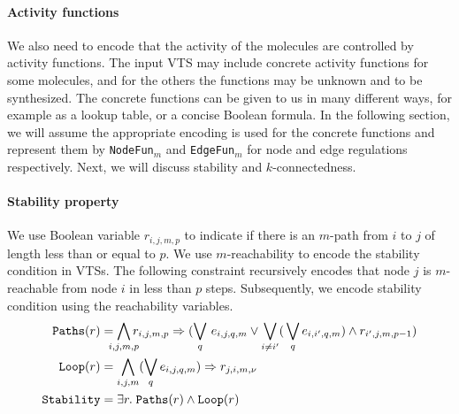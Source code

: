 \paragraph{Activity functions}
%
We also need to encode that the activity of the molecules are
controlled by activity functions.
%
The input VTS may include concrete activity functions for some molecules,
and for the others the functions may be unknown and to be synthesized. 
%
The concrete functions can be given to us in many different ways,
for example as a lookup table, or a concise Boolean formula.
%
In the following section, we will assume the appropriate encoding is
used for the concrete functions and represent them by \texttt{NodeFun}$_m$
and \texttt{EdgeFun}$_m$ for node and edge regulations respectively.
%
%
%
%
Next, we will discuss stability and $k$-connectedness.
%

\paragraph{Stability property}
%
We use Boolean variable $r_{i,j,m,p}$ to indicate if there is an
$m$-path from $i$ to $j$ of length less than or equal to $p$.
%
We use $m$-reachability to encode the stability condition in VTSs.
%
The following constraint recursively encodes that node $j$ is
$m$-reachable from node $i$ in less than $p$ steps.
%
Subsequently, we encode stability condition using the reachability variables.
\begin{align*}
\texttt{Paths}(r) &= \bigwedge\limits_{\mathclap{i,j,m,p}} r_{i,j,m,p} \limplies (\bigvee_{q} \, e_{i,j,q,m} \lor \bigvee_{i\neq i^{\prime}} ( \, \bigvee_{q} e_{i,i^{\prime},q,m}) \land r_{i^{\prime},j,m,p-1} )
\\
\texttt{Loop}(r) &= \bigwedge\limits_{i,j,m} (\bigvee_{q} e_{i,j,q,m}) \limplies r_{j,i,m,\nu}
\\
\texttt{Stability} &= \exists r. \; \texttt{Paths}(r) \land \texttt{Loop}(r)
\end{align*}

